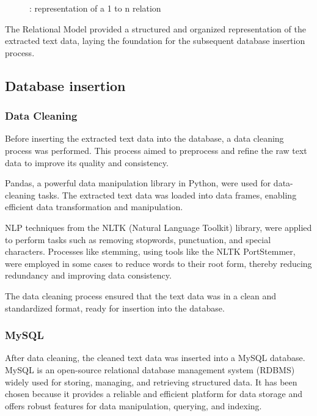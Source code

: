 \begin{figure}[H]
    \hspace{0.5em}  %
    : representation of a 1 to n relation
    \label{fig:1_to_n}
\end{figure}



The Relational Model provided a structured and organized representation of the extracted text data, laying the foundation for the subsequent database insertion process.

\subsection{Database insertion}
\subsubsection{Data Cleaning}
Before inserting the extracted text data into the database, a data cleaning process was performed. This process aimed to preprocess and refine the raw text data to improve its quality and consistency.

Pandas, a powerful data manipulation library in Python, were used for data-cleaning tasks. The extracted text data was loaded into data frames, enabling efficient data transformation and manipulation.

NLP techniques from the NLTK (Natural Language Toolkit) library, were applied to perform tasks such as removing stopwords, punctuation, and special characters. Processes like stemming, using tools like the NLTK PortStemmer, were employed in some cases to reduce words to their root form, thereby reducing redundancy and improving data consistency.

The data cleaning process ensured that the text data was in a clean and standardized format, ready for insertion into the database.
\subsubsection{MySQL}
After data cleaning, the cleaned text data was inserted into a MySQL database. 
MySQL is an open-source relational database management system (RDBMS) widely used for storing, managing, and retrieving structured data. It has been chosen because it provides a reliable and efficient platform for data storage and offers robust features for data manipulation, querying, and indexing. 

